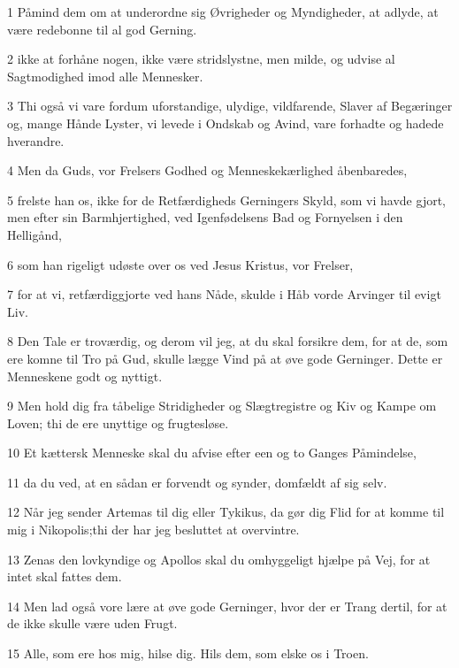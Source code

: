 \par 1 Påmind dem om at underordne sig Øvrigheder og Myndigheder, at adlyde, at være redebonne til al god Gerning.
\par 2 ikke at forhåne nogen, ikke være stridslystne, men milde, og udvise al Sagtmodighed imod alle Mennesker.
\par 3 Thi også vi vare fordum uforstandige, ulydige, vildfarende, Slaver af Begæringer og, mange Hånde Lyster, vi levede i Ondskab og Avind, vare forhadte og hadede hverandre.
\par 4 Men da Guds, vor Frelsers Godhed og Menneskekærlighed åbenbaredes,
\par 5 frelste han os, ikke for de Retfærdigheds Gerningers Skyld, som vi havde gjort, men efter sin Barmhjertighed, ved Igenfødelsens Bad og Fornyelsen i den Helligånd,
\par 6 som han rigeligt udøste over os ved Jesus Kristus, vor Frelser,
\par 7 for at vi, retfærdiggjorte ved hans Nåde, skulde i Håb vorde Arvinger til evigt Liv.
\par 8 Den Tale er troværdig, og derom vil jeg, at du skal forsikre dem, for at de, som ere komne til Tro på Gud, skulle lægge Vind på at øve gode Gerninger. Dette er Menneskene godt og nyttigt.
\par 9 Men hold dig fra tåbelige Stridigheder og Slægtregistre og Kiv og Kampe om Loven; thi de ere unyttige og frugtesløse.
\par 10 Et kættersk Menneske skal du afvise efter een og to Ganges Påmindelse,
\par 11 da du ved, at en sådan er forvendt og synder, domfældt af sig selv.
\par 12 Når jeg sender Artemas til dig eller Tykikus, da gør dig Flid for at komme til mig i Nikopolis;thi der har jeg besluttet at overvintre.
\par 13 Zenas den lovkyndige og Apollos skal du omhyggeligt hjælpe på Vej, for at intet skal fattes dem.
\par 14 Men lad også vore lære at øve gode Gerninger, hvor der er Trang dertil, for at de ikke skulle være uden Frugt.
\par 15 Alle, som ere hos mig, hilse dig. Hils dem, som elske os i Troen.



